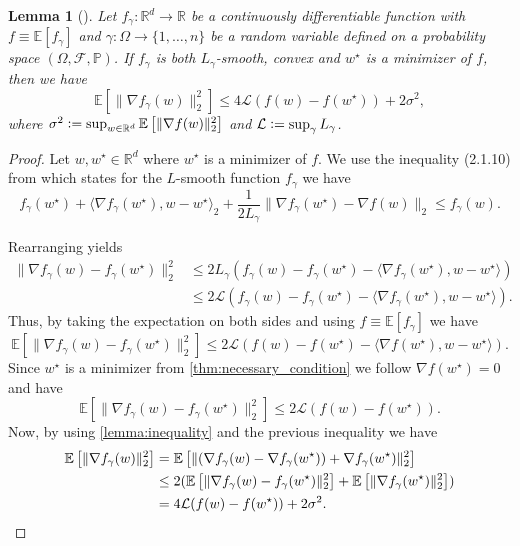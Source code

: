 \documentclass[12pt]{article}
\newtheorem{lemma}[lemma]{Lemma}
\theoremstyle{definition}
\numberwithin{equation}{section}
\newcommand{\R}{\mathbb{R}}
\newcommand{\BP}{\mathbb{P}}
\newcommand{\CF}{\mathcal{F}}
\newcommand{\CL}{\mathcal{L}}
\newcommand{\ev}[1]{\mathbb{E}\left[{#1}\right]}
\newcommand{\norm}[1]{\lVert{#1}\rVert_2}
\newcommand{\scp}[2]{\langle{#1}, {#2}\rangle_2}
\newcommand{\defeq}{\vcentcolon=}
\begin{document}
\begin{lemma}[]
  \label{lemma:gradient_inequality}
  Let $f_{\gamma} : \R^d \rightarrow \R$ be a continuously differentiable function with $f \equiv \ev{f_{\gamma}}$ and $\gamma : \Omega \rightarrow \{1,\dots,n\}$ be a random variable defined on a probability space $(\Omega, \CF, \BP)$. If $f_{\gamma}$ is both $L_{\gamma}$-smooth, convex and $w^\star$ is a minimizer of $f$, then we have
  \begin{equation}
    \ev{\norm{\nabla f_{\gamma}(w)}^2} \leq 4 \CL (f(w) - f(w^\star)) + 2 \sigma^2,
  \end{equation}
  where $\sigma^2 \defeq \sup_{w \in \R^d} \ev{\norm{\nabla f(w)}^2}$ and $\CL \defeq \sup_{\gamma} L_{\gamma}$.
\end{lemma}
\begin{proof}
  Let $w, w^\star \in \R^d$ where $w^\star$ is a minimizer of $f$. We use the inequality (2.1.10) from \autocite{nesterovLecturesConvexOptimization2018} which states for the $L$-smooth function $f_\gamma$ we have
  \begin{equation*}
    f_\gamma(w^\star) + \scp{\nabla f_\gamma(w^\star)}{w - w^\star} + \frac{1}{2 L_\gamma}\norm{\nabla f_\gamma(w^\star) - \nabla f(w)} \leq f_\gamma(w).
  \end{equation*}
  
  Rearranging yields
  \begin{align*}
    \norm{\nabla f_{\gamma}(w) - f_{\gamma}(w^\star)}^2 &\leq 2L_{\gamma}(f_{\gamma}(w) - f_{\gamma}(w^\star) - \langle \nabla f_{\gamma}(w^\star), w - w^\star \rangle) \\
    &\leq 2\CL(f_{\gamma}(w) - f_{\gamma}(w^\star) - \langle \nabla f_{\gamma}(w^\star), w - w^\star \rangle).
  \end{align*}
  Thus, by taking the expectation on both sides and using $f \equiv \ev{f_\gamma}$ we have
  \begin{equation*}
    \ev{\norm{\nabla f_{\gamma}(w) - f_{\gamma}(w^\star)}^2 } \leq 2\CL(f(w) - f(w^\star) - \langle \nabla f(w^\star), w - w^\star \rangle).
  \end{equation*}
  Since $w^\star$ is a minimizer from \autoref{thm:necessary_condition} we follow $\nabla f(w^\star) = 0$ and have
  \begin{equation*}
    \ev{\norm{\nabla f_{\gamma}(w) - f_{\gamma}(w^\star)}^2 } \leq 2\CL(f(w) - f(w^\star)).
  \end{equation*}
  Now, by using \autoref{lemma:inequality} and the previous inequality we have
  \begin{align*}
    \ev{\norm{\nabla f_{\gamma}(w)}^2} &= \ev{\norm{(\nabla f_{\gamma}(w) - \nabla f_{\gamma}(w^\star)) + \nabla f_{\gamma}(w^\star)}^2} \\
    &\leq 2( \ev{\norm{\nabla f_{\gamma}(w) - f_{\gamma}(w^\star)}^2 } + \ev{\norm{\nabla f_{\gamma}(w^\star)}^2}) \\
    &= 4\CL(f(w) - f(w^\star)) + 2\sigma^2. \qedhere
  \end{align*}
\end{proof}
\end{document}
